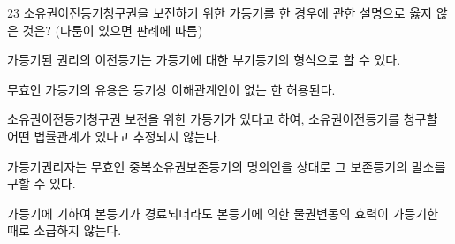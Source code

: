 \begin{question}{23}
소유권이전등기청구권을 보전하기 위한 가등기를 한 경우에 관한 설명으로 옳지 않은 것은? (다툼이 있으면 판례에 따름)
\begin{choices}
  \item 가등기된 권리의 이전등기는 가등기에 대한 부기등기의 형식으로 할 수 있다.
  \item 무효인 가등기의 유용은 등기상 이해관계인이 없는 한 허용된다.
  \item 소유권이전등기청구권 보전을 위한 가등기가 있다고 하여, 소유권이전등기를 청구할 어떤 법률관계가 있다고 추정되지 않는다.
  \item 가등기권리자는 무효인 중복소유권보존등기의 명의인을 상대로 그 보존등기의 말소를 구할 수 있다.
  \item 가등기에 기하여 본등기가 경료되더라도 본등기에 의한 물권변동의 효력이 가등기한 때로 소급하지 않는다.
\end{choices}
\end{question}
